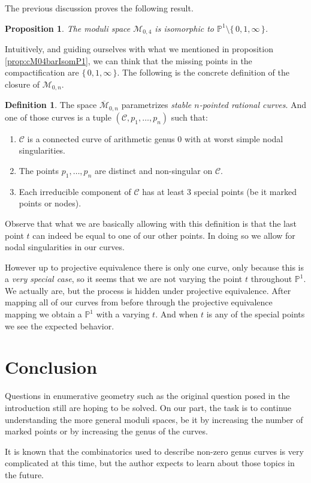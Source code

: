 \documentclass[11pt]{article}
\newcommand{\bP}{\mathbb{P}}
\newcommand{\ov}{\overline}        %
\newcommand{\cM}{\mathcal{M}}           %
\newcommand{\cC}{\mathcal{C}}           %
\newcommand{\set}[1]{\{\,#1\,\}}    %
\newcommand{\less}{\setminus}           %
\newtheorem{Prop}{Proposition}         %
\theoremstyle{definition}
\newtheorem{Def}{Definition}           %
\theoremstyle{remark}
\numberwithin{theorem}{section}
\begin{document}
The previous discussion proves the following result.

\begin{Prop}
    The moduli space $\cM_{0,4}$ is isomorphic to $\bP^1\less\set{0,1,\infty}$.
\end{Prop}

Intuitively, and guiding ourselves with what we mentioned in proposition \ref{prop:cM04barIsomP1}, we can think that the missing points in the compactification are $\set{0,1,\infty}$. The following is the concrete definition of the closure of $\cM_{0,n}$.

\begin{Def}
    The space $\ov{\cM}_{0,n}$ parametrizes \emph{stable $n$-pointed rational curves}. And one of those curves is a tuple $(\cC,p_1,\dots,p_n)$ such that:
    \begin{enumerate}
        \itemsep=-0.4em
        \item $\cC$ is a connected curve of arithmetic genus 0 with at worst simple nodal singularities.
        \item The points $p_1,\dots,p_n$ are distinct and non-singular on $\cC$.
        \item Each irreducible component of $\cC$ has at least $3$ special points (be it marked points or nodes).
    \end{enumerate}
\end{Def}

Observe that what we are basically allowing with this definition is that the last point $t$ can indeed be equal to one of our other points. In doing so we allow for nodal singularities in our curves.\par 
However up to projective equivalence there is only one curve, only because this is a \emph{very special case}, so it seems that we are not varying the point $t$ throughout $\bP^1$. We actually are, but the process is hidden under projective equivalence. After mapping all of our curves from before through the projective equivalence mapping we obtain a $\bP^1$ with a varying $t$. And when $t$ is any of the special points we see the expected behavior.

\section{Conclusion}

Questions in enumerative geometry such as the original question posed in the introduction still are hoping to be solved. On our part, the task is to continue understanding the more general moduli spaces, be it by increasing the number of marked points or by increasing the genus of the curves.\par 
It is known that the combinatorics used to describe non-zero genus curves is very complicated at this time, but the author expects to learn about those topics in the future. 
\end{document}
